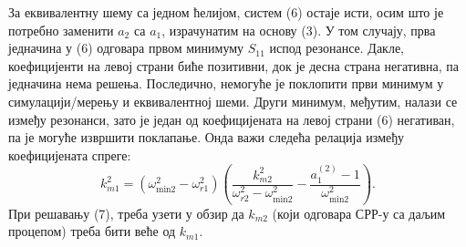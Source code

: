 За еквивалентну шему са једном ћелијом, систем (6) остаје исти, осим што је потребно заменити $a_2$ са $a_1$, израчунатим на основу (3). У том случају, прва једначина у (6) одговара првом минимуму $S_{11}$ испод резонансе. Дакле, коефицијенти на левој страни биће позитивни, док је десна страна негативна, па једначина нема решења. Последично, немогуће је поклопити први минимум у симулацији/мерењу и еквивалентној шеми. Други минимум, међутим, налази се између резонанси, зато је један од коефицијената на левој страни (6) негативан, па је могуће извршити поклапање. Онда важи следећа релација између коефицијената спреге:
\begin{equation}
k_{m1}^2 = \left(\omega_\text{min2}^2-\omega_{r1}^2 \right) \left(\frac{k_{m2}^2}{\omega_{r2}^2-\omega_\text{min2}^2 } - \frac{a_1^{(2)}-1}{\omega_\text{min2}^2}\right).
\end{equation}
При решавању (7), треба узети у обзир да $k_{m2}$
(који одговара СРР-у са даљим процепом) треба бити веће од $k_{m1}$. 

